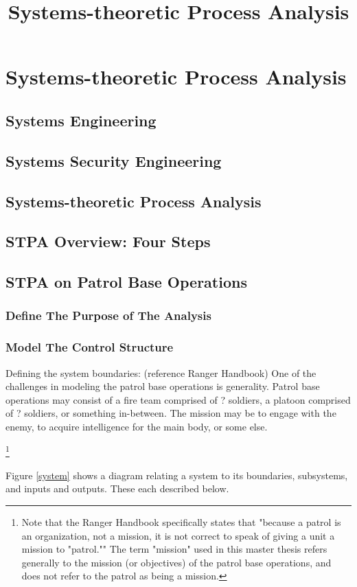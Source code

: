 \documentclass[../../main/main.tex]{subfiles}
\begin{document}
\title{Systems-theoretic Process Analysis}


\chapter{Systems-theoretic Process Analysis}
\section{Systems Engineering}
\section{Systems Security Engineering}
\section{Systems-theoretic Process Analysis}
\section{STPA Overview: Four Steps}
\section{STPA on Patrol Base Operations}
\subsection{Define The Purpose of The Analysis}
\subsection{Model The Control Structure}
Defining the system boundaries: (reference Ranger Handbook)
One of the challenges in modeling the patrol base operations is generality.  Patrol base operations may consist of a fire team comprised of ? soldiers, a platoon comprised of ? soldiers, or something in-between.  The mission may be to engage with the enemy, to acquire intelligence for the main body, or some else.

\footnote{Note that the Ranger Handbook specifically states that "because a patrol is an organization, not a mission, it is not correct to speak of giving a unit a mission to "patrol.""  The term "mission" used in this master thesis refers generally to the mission (or objectives) of the patrol base operations, and does not refer to the patrol as being a mission.}

Figure \ref{system} shows a diagram relating a system to its boundaries, subsystems, and inputs and outputs.  These each described below.
\end{document}
